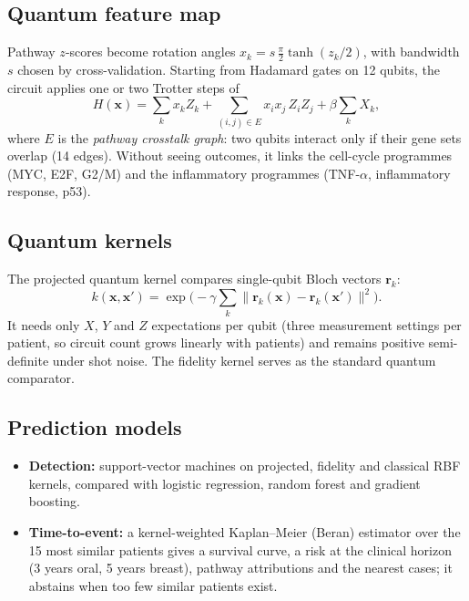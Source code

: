 \documentclass[11pt,a4paper]{article}
\begin{document}
\subsection{Quantum feature map}
Pathway $z$-scores become rotation angles $x_k = s\,\tfrac{\pi}{2}\tanh(z_k/2)$, with bandwidth $s$ chosen by cross-validation. Starting from Hadamard gates on 12 qubits, the circuit applies one or two Trotter steps of
\begin{equation}
H(\mathbf{x}) = \sum_{k} x_k Z_k + \sum_{(i,j)\in E} x_i x_j\, Z_i Z_j + \beta \sum_k X_k ,
\end{equation}
where $E$ is the \emph{pathway crosstalk graph}: two qubits interact only if their gene sets overlap (14 edges). Without seeing outcomes, it links the cell-cycle programmes (MYC, E2F, G2/M) and the inflammatory programmes (TNF-$\alpha$, inflammatory response, p53).

\subsection{Quantum kernels}
The projected quantum kernel \cite{huang2021} compares single-qubit Bloch vectors $\mathbf{r}_k$:
\begin{equation}
k(\mathbf{x},\mathbf{x}') = \exp\Big(-\gamma \sum_{k} \lVert \mathbf{r}_k(\mathbf{x}) - \mathbf{r}_k(\mathbf{x}') \rVert^2\Big).
\end{equation}
It needs only $X$, $Y$ and $Z$ expectations per qubit (three measurement settings per patient, so circuit count grows linearly with patients) and remains positive semi-definite under shot noise. The fidelity kernel \cite{havlicek} serves as the standard quantum comparator.

\subsection{Prediction models}
\begin{itemize}
\item \textbf{Detection:} support-vector machines on projected, fidelity and classical RBF kernels, compared with logistic regression, random forest and gradient boosting.
\item \textbf{Time-to-event:} a kernel-weighted Kaplan--Meier (Beran) estimator \cite{beran} over the 15 most similar patients gives a survival curve, a risk at the clinical horizon (3 years oral, 5 years breast), pathway attributions and the nearest cases; it abstains when too few similar patients exist.
\end{itemize}
\end{document}
